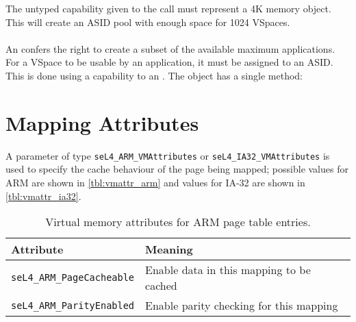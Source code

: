 The untyped
capability given to the  call must represent a 4K memory object.
This will create an ASID pool with enough space for 1024 VSpaces.

\paragraph{}

An  confers the right to create a subset of the available
maximum applications. For a VSpace to be usable by an application, it
must be assigned to an ASID. This is done using a capability to an
. The  object has a single method:
\vspace{2ex}\\

\section{Mapping Attributes}
A parameter of type \texttt{seL4\_ARM\_VMAttributes} or
\texttt{seL4\_IA32\_VMAttributes} is used to specify the cache behaviour of the
page being mapped; possible values for ARM are shown in \autoref{tbl:vmattr_arm} \ifxeightsix and values for IA-32 are shown in \autoref{tbl:vmattr_ia32}\fi.

\begin{table}[htb]
  \begin{center}
    \begin{tabularx}{\textwidth}{p{}X}
      \toprule
      Attribute & Meaning \\
      \midrule
      \texttt{seL4\_ARM\_PageCacheable} & Enable data in this mapping
      to be cached \\
      \texttt{seL4\_ARM\_ParityEnabled} & Enable parity checking for
      this mapping\\
      \bottomrule
    \end{tabularx}
    \caption{\label{tbl:vmattr_arm} Virtual memory attributes for ARM page
      table entries.}
  \end{center}
\end{table}


